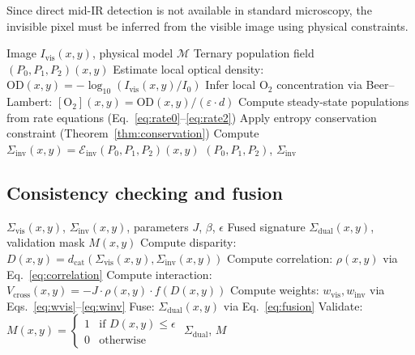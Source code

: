 \documentclass[11pt,twocolumn,a4paper]{article}
\newcommand{\Sigvis}{\Sigma_{\mathrm{vis}}}
\newcommand{\Siginv}{\Sigma_{\mathrm{inv}}}
\newcommand{\dcat}{d_{\mathrm{cat}}}
\begin{document}
Since direct mid-IR detection is not available in standard microscopy, the invisible pixel must be inferred from the visible image using physical constraints.

\begin{algorithm}[H]
\caption{Invisible Pixel Estimation}\label{alg:invisible}
\begin{algorithmic}[1]
\REQUIRE Image $I_{\mathrm{vis}}(x,y)$, physical model $\mathcal{M}$
\ENSURE Ternary population field $(P_0, P_1, P_2)(x,y)$
    \STATE Estimate local optical density: $\mathrm{OD}(x,y) = -\log_{10}(I_{\mathrm{vis}}(x,y)/I_0)$
    \STATE Infer local O$_2$ concentration via Beer--Lambert: $[\mathrm{O}_2](x,y) = \mathrm{OD}(x,y) / (\varepsilon \cdot d)$
    \STATE Compute steady-state populations from rate equations (Eq.~\ref{eq:rate0}--\ref{eq:rate2})
    \STATE Apply entropy conservation constraint (Theorem~\ref{thm:conservation})
\ENDFOR
\STATE Compute $\Siginv(x,y) = \mathcal{E}_{\mathrm{inv}}(P_0, P_1, P_2)(x,y)$
\RETURN $(P_0, P_1, P_2)$, $\Siginv$
\end{algorithmic}
\end{algorithm}

\subsection{Consistency checking and fusion}

\begin{algorithm}[H]
\caption{Stereogram Fusion}\label{alg:fusion}
\begin{algorithmic}[1]
\REQUIRE $\Sigvis(x,y)$, $\Siginv(x,y)$, parameters $J$, $\beta$, $\epsilon$
\ENSURE Fused signature $\Sigma_{\mathrm{dual}}(x,y)$, validation mask $M(x,y)$
    \STATE Compute disparity: $D(x,y) = \dcat(\Sigvis(x,y), \Siginv(x,y))$
    \STATE Compute correlation: $\rho(x,y)$ via Eq.~\ref{eq:correlation}
    \STATE Compute interaction: $V_{\mathrm{cross}}(x,y) = -J \cdot \rho(x,y) \cdot f(D(x,y))$
    \STATE Compute weights: $w_{\mathrm{vis}}, w_{\mathrm{inv}}$ via Eqs.~\ref{eq:wvis}--\ref{eq:winv}
    \STATE Fuse: $\Sigma_{\mathrm{dual}}(x,y)$ via Eq.~\ref{eq:fusion}
    \STATE Validate: $M(x,y) = \begin{cases} 1 & \text{if } D(x,y) \leq \epsilon \\ 0 & \text{otherwise} \end{cases}$
\ENDFOR
\RETURN $\Sigma_{\mathrm{dual}}$, $M$
\end{algorithmic}
\end{algorithm}
\end{document}
